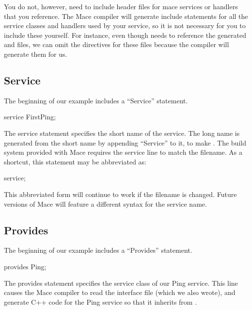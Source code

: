 You do not, however, need to include header files for mace services or
handlers that you reference.  The Mace compiler will generate include
statements for all the service classes and handlers used by your
service, so it is not necessary for you to include these yourself.
For instance, even though  needs to reference the
generated  and
 files, we can omit the
 directives for these files because the compiler
will generate them for us.


\subsection{Service}
\label{sec:service}

The beginning of our example includes a ``Service'' statement.

\begin{programlisting}
service FirstPing;
\end{programlisting}

The service statement specifies the short name of the service.  The long name
is generated from the short name by appending ``Service'' to it, to make
.  The build system provided with Mace requires the
service line to match the filename.  As a shortcut, this statement may be
abbreviated as:

\begin{programlisting}
service;
\end{programlisting}

This abbreviated form will continue to work if the filename is changed.  Future
versions of Mace will feature a different syntax for the service name.

\subsection{Provides}
\label{sec:provides}

The beginning of our example includes a ``Provides'' statement.

\begin{programlisting}
provides Ping;
\end{programlisting}

The provides statement specifies the service class of our Ping
service.  This line causes the Mace compiler to read the
 interface file (which we also wrote), and
generate C++ code for the Ping service so that it inherits from
.

